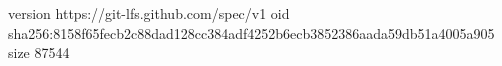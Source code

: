 version https://git-lfs.github.com/spec/v1
oid sha256:8158f65fecb2c88dad128cc384adf4252b6ecb3852386aada59db51a4005a905
size 87544
